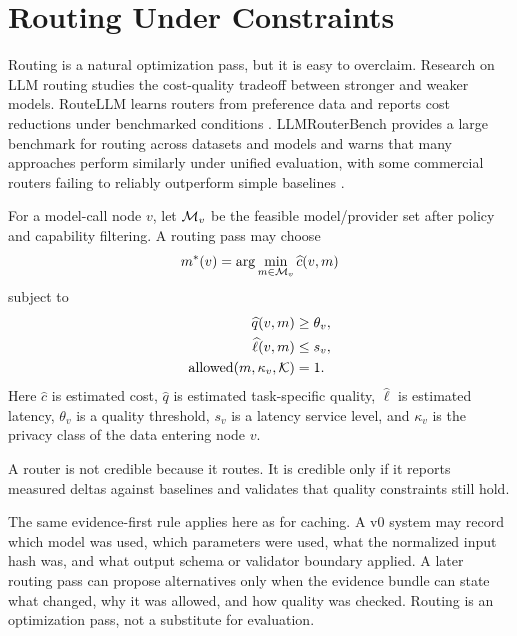 \section{Routing Under Constraints}

Routing is a natural optimization pass, but it is easy to overclaim. Research on LLM routing studies the cost-quality tradeoff between stronger and weaker models. RouteLLM learns routers from preference data and reports cost reductions under benchmarked conditions \citep{routellm}. LLMRouterBench provides a large benchmark for routing across datasets and models and warns that many approaches perform similarly under unified evaluation, with some commercial routers failing to reliably outperform simple baselines \citep{llmrouterbench}.

For a model-call node $v$, let $\mathcal{M}_v$ be the feasible model/provider set after policy and capability filtering. A routing pass may choose
\begin{equation}
m^*(v)=\arg\min_{m\in\mathcal{M}_v} \widehat c(v,m)
\label{eq:routing}
\end{equation}
subject to
\begin{align}
\widehat q(v,m) &\geq \theta_v, \\
\widehat \ell(v,m) &\leq s_v, \\
\mathrm{allowed}(m,\kappa_v,\mathcal{K}) &= 1.
\end{align}
Here $\widehat c$ is estimated cost, $\widehat q$ is estimated task-specific quality, $\widehat \ell$ is estimated latency, $\theta_v$ is a quality threshold, $s_v$ is a latency service level, and $\kappa_v$ is the privacy class of the data entering node $v$.

A \migaki{} router is not credible because it routes. It is credible only if it reports measured deltas against baselines and validates that quality constraints still hold.

The same evidence-first rule applies here as for caching. A v0 system may record which model was used, which parameters were used, what the normalized input hash was, and what output schema or validator boundary applied. A later routing pass can propose alternatives only when the evidence bundle can state what changed, why it was allowed, and how quality was checked. Routing is an optimization pass, not a substitute for evaluation.
